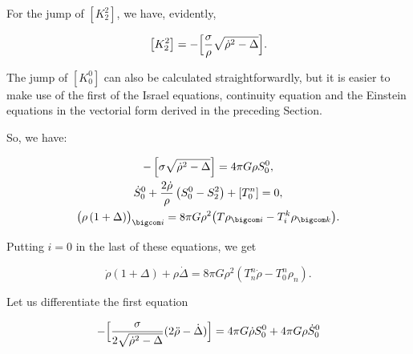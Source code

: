 For the jump of $\left[ K^2_2 \right]$, we have, evidently,

\begin{equation}

\label{k22}

\left[ K^2_2 \right] = - \Bigl[\frac{\sigma}{\rho} \sqrt{\dot \rho^2 - \Delta}\Bigr] .

\end{equation}

The jump of $\left[K^0_0 \right]$ can also be calculated straightforwardly, but it is easier to make use of the first of the Israel equations, continuity equation and the Einstein equations in the vectorial form derived in the preceding Section. 

So, we have:

\begin{gather}

\label{fork00}

- \left[\sigma \sqrt{\dot \rho^2 - \Delta} \right] = 4 \pi G \rho S^0_0  , \\

\dot S^0_0 + \frac{2 \dot \rho}{\rho} \left(S^0_0 - S^2_2 \right) + \left[T_0^n \right] = 0 , \\

\bigl(\rho \left( 1 + \Delta \right) \bigr)_{\bigcom i} = 8 \pi G \rho^2 \bigl( T \rho_{\bigcom i} - T_i^k \rho_{\bigcom k}\bigr) .

\end{gather}

Putting $i = 0$ in the last of these equations, we get

\begin{equation}

\label{tempee}

\dot \rho \left(1 + \Delta \right) + \rho \dot \Delta = 8 \pi G \rho^2 \left( T^n_n \dot \rho - T_0^n \rho_n \right) .

\end{equation}

Let us differentiate the first equation

\begin{equation}

\label{rodd}

- \Bigl[\frac{\sigma}{2 \sqrt{\dot \rho^2 - \Delta}} (2 \ddot \rho - \dot \Delta ) \Bigr] =

4 \pi G \dot \rho S^0_0 + 4 \pi G \rho \dot S^0_0

\end{equation}


